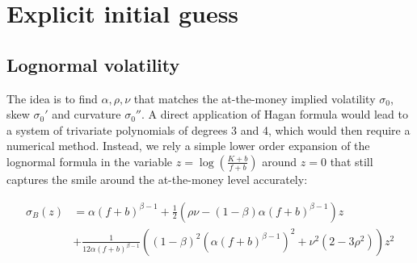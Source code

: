 \documentclass[]{rAMF2e}
\begin{document}
\section{Explicit initial guess}
\subsection{Lognormal volatility}
The idea is to find $\alpha, \rho, \nu$ that matches the at-the-money implied volatility $\sigma_0$, skew $\sigma_0'$ and curvature $\sigma_0''$. A direct application of Hagan formula would lead to a system of trivariate polynomials of degrees 3 and 4, which would then require a numerical method. Instead, we rely a simple lower order expansion of the lognormal formula in the variable $z=\log\left(\frac{K+b}{f+b}\right)$ around $z=0$ that still captures the smile around the at-the-money level accurately:

\begin{align}
\sigma_B(z) &= \alpha (f+b)^{\beta-1} + \frac{1}{2}\left(\rho \nu - (1-\beta)\alpha (f+b)^{\beta-1}\right)z \nonumber\\
&+ \frac{1}{12\alpha (f+b)^{\beta-1}}\left((1-\beta)^2(\alpha (f+b)^{\beta-1})^2 + \nu^2(2-3\rho^2)\right)z^2
\end{align}
\end{document}

